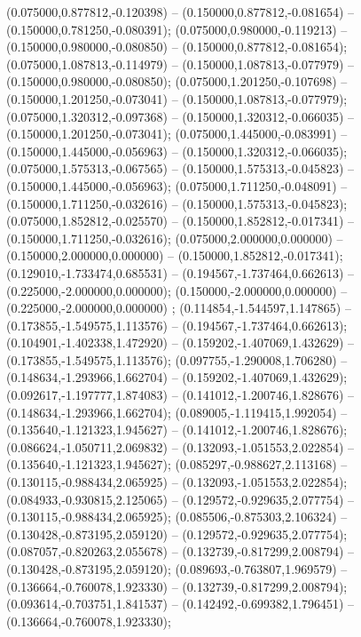  (0.075000,0.877812,-0.120398) -- (0.150000,0.877812,-0.081654) -- (0.150000,0.781250,-0.080391);
 (0.075000,0.980000,-0.119213) -- (0.150000,0.980000,-0.080850) -- (0.150000,0.877812,-0.081654);
 (0.075000,1.087813,-0.114979) -- (0.150000,1.087813,-0.077979) -- (0.150000,0.980000,-0.080850);
 (0.075000,1.201250,-0.107698) -- (0.150000,1.201250,-0.073041) -- (0.150000,1.087813,-0.077979);
 (0.075000,1.320312,-0.097368) -- (0.150000,1.320312,-0.066035) -- (0.150000,1.201250,-0.073041);
 (0.075000,1.445000,-0.083991) -- (0.150000,1.445000,-0.056963) -- (0.150000,1.320312,-0.066035);
 (0.075000,1.575313,-0.067565) -- (0.150000,1.575313,-0.045823) -- (0.150000,1.445000,-0.056963);
 (0.075000,1.711250,-0.048091) -- (0.150000,1.711250,-0.032616) -- (0.150000,1.575313,-0.045823);
 (0.075000,1.852812,-0.025570) -- (0.150000,1.852812,-0.017341) -- (0.150000,1.711250,-0.032616);
 (0.075000,2.000000,0.000000) -- (0.150000,2.000000,0.000000) -- (0.150000,1.852812,-0.017341);
 (0.129010,-1.733474,0.685531) -- (0.194567,-1.737464,0.662613) -- (0.225000,-2.000000,0.000000);
 (0.150000,-2.000000,0.000000) -- (0.225000,-2.000000,0.000000) ;
 (0.114854,-1.544597,1.147865) -- (0.173855,-1.549575,1.113576) -- (0.194567,-1.737464,0.662613);
 (0.104901,-1.402338,1.472920) -- (0.159202,-1.407069,1.432629) -- (0.173855,-1.549575,1.113576);
 (0.097755,-1.290008,1.706280) -- (0.148634,-1.293966,1.662704) -- (0.159202,-1.407069,1.432629);
 (0.092617,-1.197777,1.874083) -- (0.141012,-1.200746,1.828676) -- (0.148634,-1.293966,1.662704);
 (0.089005,-1.119415,1.992054) -- (0.135640,-1.121323,1.945627) -- (0.141012,-1.200746,1.828676);
 (0.086624,-1.050711,2.069832) -- (0.132093,-1.051553,2.022854) -- (0.135640,-1.121323,1.945627);
 (0.085297,-0.988627,2.113168) -- (0.130115,-0.988434,2.065925) -- (0.132093,-1.051553,2.022854);
 (0.084933,-0.930815,2.125065) -- (0.129572,-0.929635,2.077754) -- (0.130115,-0.988434,2.065925);
 (0.085506,-0.875303,2.106324) -- (0.130428,-0.873195,2.059120) -- (0.129572,-0.929635,2.077754);
 (0.087057,-0.820263,2.055678) -- (0.132739,-0.817299,2.008794) -- (0.130428,-0.873195,2.059120);
 (0.089693,-0.763807,1.969579) -- (0.136664,-0.760078,1.923330) -- (0.132739,-0.817299,2.008794);
 (0.093614,-0.703751,1.841537) -- (0.142492,-0.699382,1.796451) -- (0.136664,-0.760078,1.923330);
